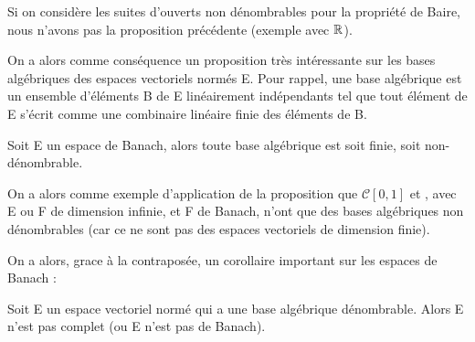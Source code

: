 \begin{remarque}
	Si on considère les suites d'ouverts non dénombrables pour la propriété de
	Baire, nous n'avons pas la proposition précédente (exemple avec $\mathbb{R}$).
\end{remarque}

On a alors comme conséquence un proposition très intéressante sur les bases
algébriques des espaces vectoriels normés E. Pour rappel, une base algébrique
est un ensemble d'éléments B de E linéairement indépendants tel que tout élément
de E s'écrit comme une combinaire linéaire finie des éléments de B.

\begin{proposition}
	Soit E un espace de Banach, alors toute base algébrique est soit finie, soit
	non-dénombrable.
\end{proposition}

On a alors comme exemple d'application de la proposition que $\mathcal{C}[0, 1]$
et , avec E ou F de dimension infinie, et F de Banach,
n'ont que des bases algébriques non dénombrables (car ce ne sont pas des espaces
vectoriels de dimension finie).

On a alors, grace à la contraposée, un corollaire important sur les espaces de
Banach :

\begin{corollary}
	Soit E un espace vectoriel normé qui a une base algébrique dénombrable.
	Alors E n'est pas complet (ou E n'est pas de Banach).
\end{corollary}
